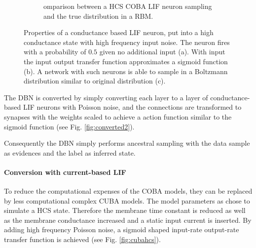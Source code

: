 \begin{figure}
\begin{subfigure}[t]{.5\textwidth}
  		\caption{omparison between a HCS COBA LIF neuron sampling and the true distribution in a RBM.}
  		\label{fig:cobahcs3}
	\end{subfigure}
	\caption[Properties of a conductance based LIF neuron in a high conductance state.]{Properties of a conductance based LIF neuron, put into a high conductance state with high frequency input noise. The neuron fires with a probability of $0.5$ given no additional input (a). With input the input output transfer function approximates a sigmoid function (b). A network with such neurons is able to sample in a Boltzmann distribution similar to original distribution (c). }
	\label{fig:cobahcs}

\end{figure}
  
The DBN is converted by simply converting each layer to a layer of conductance-based LIF neurons with Poisson noise, and the connections are transformed to synapses with the weights scaled to achieve a action function similar to the sigmoid function (see Fig. \ref{fig:converted2}).

Consequently the DBN simply performs ancestral sampling with the data sample as evidences and the label as inferred state.   


\paragraph{Conversion with current-based LIF} \label{c:convascuba}

To reduce the computational expenses of the COBA models, they can be replaced by less computational complex CUBA models.
The model parameters as chose to simulate a HCS state.
Therefore the membrane time constant is reduced as well as the membrane conductance increased and a static input current is inserted.  
By adding high frequency Poisson noise, a sigmoid shaped input-rate output-rate transfer function is achieved (see Fig. \ref{fig:cubahcs}).

